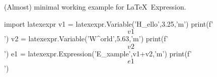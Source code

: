 \documentclass[12pt]{report}
\begin{document}
(Almost) minimal working example for \LaTeX\ Expression.
\begin{python}
import latexexpr
v1 = latexexpr.Variable('H_{ello}',3.25,'m')
print(f'$$ {v1} $$')
v2 = latexexpr.Variable('W^{orld}',5.63,'m')
print(f'$$ {v2} $$')
e1 = latexexpr.Expression('E_{xample}',v1+v2,'m')
print(f'$$ {e1} $$')
\end{python}
\end{document}
